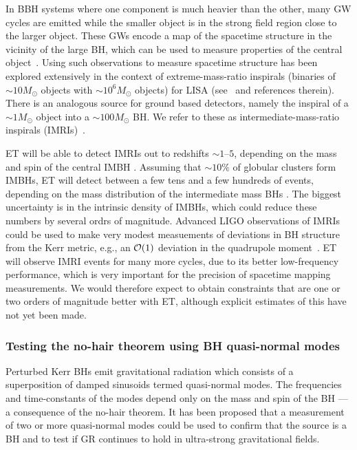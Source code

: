 In BBH systems where one component is much heavier than the other, 
many GW cycles are emitted while the smaller object is in the strong 
field region close to the larger object. These GWs encode a map of 
the spacetime structure in the vicinity of the large BH, which can be 
used to measure properties of the central object~\cite{ryan95}. Using 
such observations to measure spacetime structure has been explored 
extensively in the context of extreme-mass-ratio inspirals (binaries 
of $\sim10M_{\odot}$ objects with $\sim 10^6M_{\odot}$ objects) 
for LISA (see~\cite{AmaroSeoane:2007aw} and references therein). 
There is an analogous source for ground based detectors, namely the 
inspiral of a $\sim1M_{\odot}$ object into a $\sim100M_{\odot}$ BH. 
We refer to these as intermediate-mass-ratio inspirals (IMRIs)~\cite{LIGOimri}.


ET will be able to detect IMRIs out to redshifts $\sim 1$--$5$, 
depending on the mass and spin of the central IMBH \cite{Huerta:2011}. 
Assuming that $\sim10\%$ of globular clusters form IMBHs, ET will detect 
between a few tens and a few hundreds of events, depending on the 
mass distribution of the intermediate mass BHs \cite{Gair:2009ETrev}. The 
biggest uncertainty is in the intrinsic density of IMBHs, which could 
reduce these numbers by several ordrs of magnitude. Advanced LIGO 
observations of IMRIs could be used to make very modest measuements 
of deviations in BH structure from the Kerr metric, e.g., 
an ${\cal O}(1)$ deviation in the quadrupole moment~\cite{LIGOimri,imrirate}. 
ET will observe IMRI events for many more cycles, due to its better 
low-frequency performance, which is very important for the precision of 
spacetime mapping measurements. We would therefore expect to obtain 
constraints that are one or two orders of magnitude better with ET, 
although explicit estimates of this have not yet been made.

\subsubsection{Testing the no-hair theorem using BH quasi-normal modes}
Perturbed Kerr BHs emit gravitational radiation 
which consists of a superposition of damped sinusoids termed 
quasi-normal modes.  The frequencies and time-constants of the modes 
depend only on the mass and spin of the BH --- a consequence 
of the no-hair theorem. It has been proposed that a measurement 
of two or more quasi-normal modes could be used to confirm that the 
source is a BH and to test if GR continues to hold
in ultra-strong gravitational fields.

